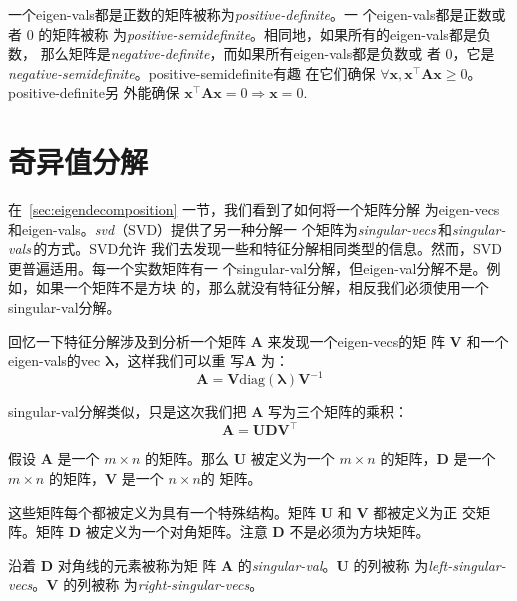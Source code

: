 一个\gls*{eigen-vals}都是正数的矩阵被称为\emph{\gls{positive-definite}}。一
个\gls*{eigen-vals}都是正数或者 $0$ 的矩阵被称
为\emph{\gls{positive-semidefinite}}。相同地，如果所有的\gls*{eigen-vals}都是负数，
那么矩阵是\emph{\gls{negative-definite}}，而如果所有\gls*{eigen-vals}都是负数或
者 $0$，它是\emph{\gls{negative-semidefinite}}。\gls*{positive-semidefinite}有趣
在它们确保
$\forall\pmb{x}, \pmb{x}^{\top}\pmb{A}\pmb{x} \geq 0$。\gls*{positive-definite}另
外能确保 $\pmb{x}^{\top}\pmb{A}\pmb{x} = 0 \Rightarrow \pmb{x} = 0$.

\section{奇异值分解}
\label{sec:singular_value_decomposition}

在~\ref{sec:eigendecomposition} 一节，我们看到了如何将一个矩阵分解
为\gls*{eigen-vecs}和\gls*{eigen-vals}。\emph{\gls{svd}}（SVD）提供了另一种分解一
个矩阵为\emph{\gls{singular-vecs}}\,和\emph{\gls{singular-vals}}\,的方式。SVD允许
我们去发现一些和特征分解相同类型的信息。然而，SVD 更普遍适用。每一个实数矩阵有一
个\gls*{singular-val}分解，但\gls*{eigen-val}分解不是。例如，如果一个矩阵不是方块
的，那么就没有特征分解，相反我们必须使用一个\gls*{singular-val}分解。

回忆一下特征分解涉及到分析一个矩阵 $\pmb{A}$ 来发现一个\gls*{eigen-vecs}的矩
阵 $\pmb{V}$ 和一个\gls*{eigen-vals}的\gls*{vec} $\pmb{\lambda}$，这样我们可以重
写$\pmb{A}$ 为：
\begin{equation}
  \pmb{A} = \pmb{V}\mathrm{diag}(\pmb{\lambda})\pmb{V}^{-1}
\end{equation}

\gls*{singular-val}分解类似，只是这次我们把 $\pmb{A}$ 写为三个矩阵的乘积：
\begin{equation}
  \pmb{A} = \pmb{U}\pmb{D}\pmb{V}^{\top}
\end{equation}

假设 $\pmb{A}$ 是一个 $m \times n$ 的矩阵。那么 $\pmb{U}$ 被定义为一个 $m \times
n$ 的矩阵，$\pmb{D}$ 是一个 $m \times n$ 的矩阵，$\pmb{V}$ 是一个 $n \times n$的
矩阵。

这些矩阵每个都被定义为具有一个特殊结构。矩阵 $\pmb{U}$ 和 $\pmb{V}$ 都被定义为正
交矩阵。矩阵 $\pmb{D}$ 被定义为一个对角矩阵。注意 $\pmb{D}$ 不是必须为方块矩阵。

沿着 $\pmb{D}$ 对角线的元素被称为矩
阵 $\pmb{A}$ 的\emph{\gls{singular-val}}。$\pmb{U}$ 的列被称
为\emph{\gls{left-singular-vecs}}。$\pmb{V}$ 的列被称
为\emph{\gls{right-singular-vecs}}。

